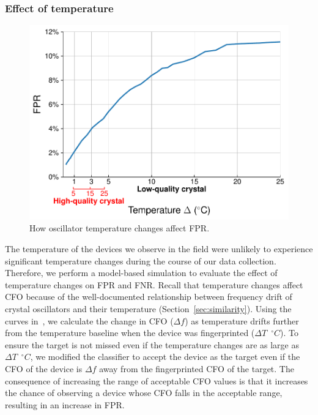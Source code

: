 \subsubsection{Effect of temperature} %
\label{sec:temp}


\begin{figure}
    \centering
    \includegraphics[width = \linewidth]{bletracking/plots/fpr_temp_thresh_new.pdf} 
    \caption{How oscillator temperature changes affect FPR.}
    \label{fig:fpr_temp}
\end{figure}


The temperature of the devices we observe in the field were unlikely to
experience significant temperature changes during the course of our data
collection. Therefore, we perform a model-based simulation to evaluate the
effect of temperature changes on FPR and FNR.  Recall that temperature changes
affect CFO because of the well-documented relationship between frequency drift
of crystal oscillators and their temperature (Section~\ref{sec:similarity}).
Using the curves in~\cite{temp_cfo1}, we calculate the change in CFO ($\Delta
f$) as temperature drifts further from the temperature baseline when the device
was fingerprinted ($\Delta T$~$^\circ C$). To ensure the target is not missed
even if the temperature changes are as large as $\Delta T$~$^\circ C$, we modified the
classifier to accept the device as the target even if the CFO of the device
is $\Delta f$ away from the fingerprinted CFO of the target. The consequence
of increasing the range of acceptable CFO values is that it increases the chance of
observing a device whose CFO falls in the acceptable range, resulting in an
increase in FPR.
 
